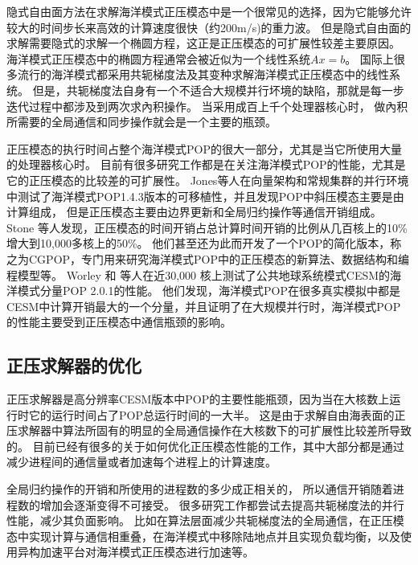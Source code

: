 隐式自由面方法在求解海洋模式正压模态中是一个很常见的选择，因为它能够允许较大的时间步长来高效的计算速度很快（约200m/s)的重力波。
但是隐式自由面的求解需要隐式的求解一个椭圆方程，这正是正压模态的可扩展性较差主要原因。 
海洋模式正压模态中的椭圆方程通常会被近似为一个线性系统$Ax=b$。 
国际上很多流行的海洋模式都采用共轭梯度法及其变种求解海洋模式正压模态中的线性系统\citep{adcroft2014mitgcm,lai2010nonhydrostatic,madec1997ocean}。
但是，共轭梯度法自身有一个不适合大规模并行坏境的缺陷，那就是每一步迭代过程中都涉及到两次求內积操作。 
当采用成百上千个处理器核心时， 做內积所需要的全局通信和同步操作就会是一个主要的瓶颈。

正压模态的执行时间占整个海洋模式POP的很大一部分，尤其是当它所使用大量的处理器核心时。
目前有很多研究工作都是在关注海洋模式POP的性能，尤其是它的正压模态的比较差的可扩展性。 
Jones\cite{pop05}等人在向量架构和常规集群的并行环境中测试了海洋模式POP1.4.3版本的可移植性，并且发现POP中斜压模态主要是由计算组成， 但是正压模态主要由边界更新和全局归约操作等通信开销组成。
Stone  \cite{stone2011cgpop}等人发现，正压模态的时间开销占总计算时间开销的比例从几百核上的10\%增大到10,000多核上的50\%。 
他们甚至还为此而开发了一个POP的简化版本，称之为CGPOP，专门用来研究海洋模式POP中的正压模态的新算法、数据结构和编程模型等。 
Worley  \cite{Worley:2011:PCE:2063384.2063457} 和 \cite{dennis2012computational} 等人在近30,000 核上测试了公共地球系统模式CESM的海洋模式分量POP 2.0.1的性能。 
他们发现，海洋模式POP在很多真实模拟中都是CESM中计算开销最大的一个分量，并且证明了在大规模并行时，海洋模式POP的性能主要受到正压模态中通信瓶颈的影响。 

\subsection{正压求解器的优化}
\label{related:improve}


正压求解器是高分辨率CESM版本中POP的主要性能瓶颈，因为当在大核数上运行时它的运行时间占了POP总运行时间的一大半。 
这是由于求解自由海表面的正压求解器中算法所固有的明显的全局通信操作在大核数下的可扩展性比较差所导致的。
目前已经有很多的关于如何优化正压模态性能的工作，其中大部分都是通过减少进程间的通信量或者加速每个进程上的计算速度。 

全局归约操作的开销和所使用的进程数的多少成正相关的， 所以通信开销随着进程数的增加会逐渐变得不可接受。
很多研究工作都尝试去提高共轭梯度法的并行性能，减少其负面影响。 
比如在算法层面减少共轭梯度法的全局通信\cite{dAzevedo1999lapack}，在正压模态中实现计算与通信相重叠\cite{beare1997optimisation}，在海洋模式中移除陆地点并且实现负载均衡\cite{dennis2007inverse, dennis2008scaling}，以及使用异构加速平台对海洋模式正压模态进行加速等。

